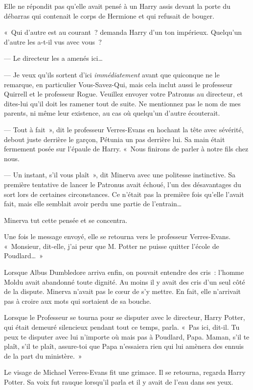 Elle ne répondit pas qu'elle avait pensé à un Harry assis devant la porte du débarras qui contenait le corps de Hermione et qui refusait de bouger.

«~Qui d'autre est au courant~? demanda Harry d'un ton impérieux. Quelqu'un d'autre les a-t-il vus avec vous~?

--- Le directeur les a amenés ici…

--- Je veux qu'ils sortent d'ici \emph{immédiatement} avant que quiconque ne le remarque, en particulier Vous-Savez-Qui, mais cela inclut aussi le professeur Quirrell et le professeur Rogue. Veuillez envoyer votre Patronus au directeur, et dites-lui qu'il doit les ramener tout de suite. Ne mentionnez pas le nom de mes parents, ni même leur existence, au cas où quelqu'un d'autre écouterait.

--- Tout à fait~», dit le professeur Verres-Evans en hochant la tête avec sévérité, debout juste derrière le garçon, Pétunia un pas derrière lui. Sa main était fermement posée sur l'épaule de Harry. «~Nous finirons de parler à notre fils chez nous.

--- Un instant, s'il vous plaît~», dit Minerva avec une politesse instinctive. Sa première tentative de lancer le Patronus avait échoué, l'un des désavantages du sort lors de certaines circonstances. Ce n'était pas la première fois qu'elle l'avait fait, mais elle semblait avoir perdu une partie de l'entrain…

Minerva tut cette pensée et se concentra.

Une fois le message envoyé, elle se retourna vers le professeur Verres-Evans. «~Monsieur, dit-elle, j'ai peur que M. Potter ne puisse quitter l'école de Poudlard…~»

Lorsque Albus Dumbledore arriva enfin, on pouvait entendre des cris~: l'homme Moldu avait abandonné toute dignité. Au moins il y avait des cris d'un seul côté de la dispute. Minerva n'avait pas le cœur de s'y mettre. En fait, elle n'arrivait pas à croire aux mots qui sortaient de sa bouche.

Lorsque le Professeur se tourna pour se disputer avec le directeur, Harry Potter, qui était demeuré silencieux pendant tout ce temps, parla. «~Pas ici, dit-il. Tu peux te disputer avec lui n'importe où mais pas à Poudlard, Papa. Maman, s'il te plaît, s'il te plaît, assure-toi que Papa n'essaiera rien qui lui amènera des ennuis de la part du ministère.~»

Le visage de Michael Verres-Evans fit une grimace. Il se retourna, regarda Harry Potter. Sa voix fut rauque lorsqu'il parla et il y avait de l'eau dans ses yeux.

